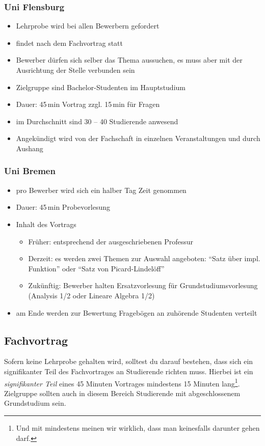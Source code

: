 \subsubsection{Uni Flensburg}
\begin{itemize}
    \item Lehrprobe wird bei allen Bewerbern gefordert
    \item findet nach dem Fachvortrag statt
    \item Bewerber dürfen sich selber das Thema aussuchen, es muss aber mit der Ausrichtung der Stelle verbunden sein
    \item Zielgruppe sind Bachelor-Studenten im Hauptstudium
    \item Dauer: 45\,min Vortrag zzgl. 15\,min für Fragen
    \item im Durchschnitt sind 30 -- 40 Studierende anwesend
    \item Angekündigt wird von der Fachschaft in einzelnen Veranstaltungen und durch Aushang
\end{itemize}

\subsubsection{Uni Bremen}
\begin{itemize}
    \item pro Bewerber wird sich ein halber Tag Zeit genommen
    \item Dauer: 45\,min Probevorlesung
    \item Inhalt des Vortrags
          \begin{itemize}
              \item Früher: entsprechend der ausgeschriebenen Professur
              \item Derzeit: es werden zwei Themen zur Auswahl angeboten: "`Satz über impl. Funktion"' oder "`Satz von Picard-Lindelöff"'
              \item Zukünftig: Bewerber halten Ersatzvorlesung für Grundstudiumsvorlesung (Analysis 1/2 oder Lineare Algebra 1/2)
          \end{itemize}
    \item am Ende werden zur Bewertung Fragebögen an zuhörende Studenten verteilt
\end{itemize}


\subsection{Fachvortrag}
Sofern keine Lehrprobe gehalten wird, solltest du darauf bestehen, dass sich ein signifikanter Teil des Fachvortrages an Studierende richten muss. Hierbei ist ein \emph{signifikanter Teil} eines 45 Minuten Vortrages mindestens 15 Minuten lang\footnote{Und mit mindestens meinen wir wirklich, dass man keinesfalls darunter gehen darf.}. Zielgruppe sollten auch in diesem Bereich Studierende mit abgeschlossenem Grundstudium sein.

